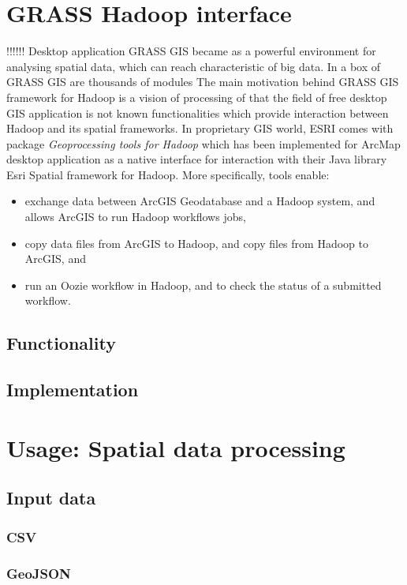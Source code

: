 \documentclass[a4paper,12pt,oneside]{report}
\begin{document}
\section{GRASS Hadoop interface}
!!!!!!
Desktop application GRASS GIS became as a powerful environment for analysing spatial data, which can 
reach characteristic of big data. In a box of GRASS GIS are thousands of modules   The main motivation 
behind GRASS GIS framework for Hadoop is a vision of processing of that  the field of free desktop GIS 
application is not known functionalities which provide interaction between Hadoop and its spatial 
frameworks. In proprietary GIS world, ESRI comes with package \textit{Geoprocessing tools for Hadoop}\cite{esri_gtfp} 
which has been implemented for ArcMap desktop application as a native interface for interaction with 
their Java library Esri Spatial framework for Hadoop. More specifically, tools enable:

\begin{itemize}
\item exchange data between  ArcGIS Geodatabase and a Hadoop system, and allows ArcGIS to run Hadoop workflows jobs,
\item copy data files from ArcGIS to Hadoop, and copy files from Hadoop to ArcGIS, and 
\item run an Oozie workflow in Hadoop, and to check the status of a submitted workflow.
\end{itemize}
 


	\subsection{Functionality}
	\subsection{Implementation}
				
\section{Usage: Spatial data processing}
	\subsection{Input data}
		\subsubsection{CSV}
		\subsubsection{GeoJSON}\label{json}	
\end{document}
